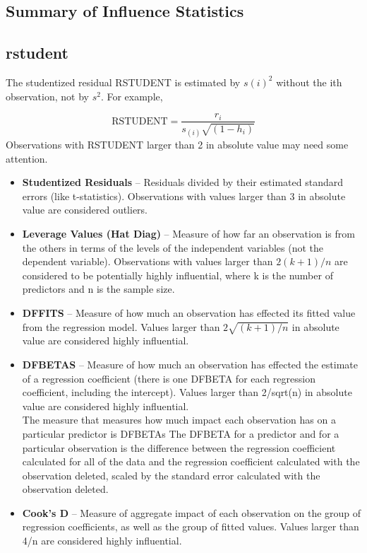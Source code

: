 \documentclass[residuals.tex]{subfiles}
\begin{document}
	\subsection{Summary of Influence Statistics}
	\subsection{rstudent}
	The studentized residual RSTUDENT is estimated by $s(i)^2$ without the ith observation, not by $s^2$. For example,
	
	\[\mbox{RSTUDENT} = \frac{r_i}{s_{(i)} \sqrt{(1 - h_i)}} \]
	Observations with RSTUDENT larger than 2 in absolute value may need some attention.
	
	
	
	
	
	\begin{itemize}
		\item	\textbf{Studentized Residuals} – Residuals divided by their estimated standard errors (like t-statistics). Observations with values larger than 3 in absolute value are considered outliers.
		\item	\textbf{Leverage Values (Hat Diag)} – Measure of how far an observation is from the others in terms of the levels of the independent variables (not the dependent variable). Observations with values larger than $2(k+1)/n$ are considered to be potentially highly influential, where k is the number of predictors and n is the sample size.
		\item	\textbf{DFFITS} – Measure of how much an observation has effected its fitted value from the regression model. Values larger than $2\sqrt{(k+1)/n}$ in absolute value are considered highly influential. %
		\item	\textbf{DFBETAS} – Measure of how much an observation has effected the estimate of a regression coefficient (there is one DFBETA for each regression coefficient, including the intercept). Values larger than 2/sqrt(n) in absolute value are considered highly influential.
		\\
		The measure that measures how much impact each observation has on a particular predictor is DFBETAs The DFBETA for a predictor and for a particular observation is the difference between the regression coefficient calculated for all of the data and the regression coefficient calculated with the observation deleted, scaled by the standard error calculated with the observation deleted. 
		
		\item	\textbf{Cook’s D} – Measure of aggregate impact of each observation on the group of regression coefficients, as well as the group of fitted values. Values larger than 4/n are considered highly influential.
	\end{itemize}
	
\end{document}
